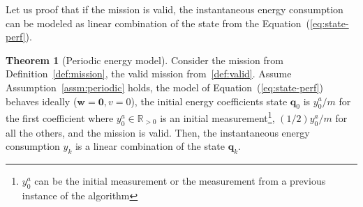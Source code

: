 \documentclass[letterpaper,10pt,conference]{ieeeconf}
\theoremstyle{definition}
\newtheorem{thm}{Theorem}[section]
\begin{document}
Let us proof that if the mission is valid, the instantaneous energy consumption can be modeled as linear combination of the state from the Equation~(\ref{eq:state-perf}).

\begin{thm}[Periodic energy model]\label{thm:state-vs-energy}
  Consider the mission from Definition~\ref{def:mission}, the valid mission from~\ref{def:valid}. Assume Assumption~\ref{assm:periodic} holds, the model of Equation~(\ref{eq:state-perf}) behaves ideally ($\mathbf{w}=\mathbf{0},v=0$), the initial energy coefficients state $\mathbf{q}_0$ is $y_0^a/m$ for the first coefficient where $y_0^a\in\mathbb{R}_{>0}$ is an initial measurement\footnote{$y_0^a$ can be the initial measurement or the measurement from a previous instance of the algorithm}, $(1/2)y_0^a/m$ for all the others, and the mission is valid.
  Then, the instantaneous energy consumption $y_k$ is a linear combination of the state $\mathbf{q}_k$.
\end{thm}
\end{document}
